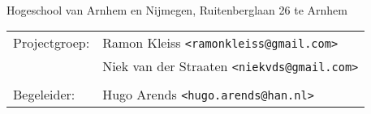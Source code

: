\begin{titlepage}

\Huge \textsc{\bfseries \autonerf} \normalsize \\

\vfill

\begin{minipage}[b][1em][b]{\linewidth}
    Hogeschool van Arnhem en Nijmegen, Ruitenberglaan 26 te Arnhem
\end{minipage}

\begin{minipage}[b][2em][b]{\linewidth}
\end{minipage}

\begin{minipage}[b][4em][b]{\linewidth}
    \begin{tabular}{l l }
        Projectgroep: & Ramon Kleiss \texttt{<ramonkleiss@gmail.com>} \\
        & Niek van der Straaten \texttt{<niekvds@gmail.com>} \\
        \\
        Begeleider: & Hugo Arends \texttt{<hugo.arends@han.nl>} \\
    \end{tabular}
\end{minipage}

\end{titlepage}

